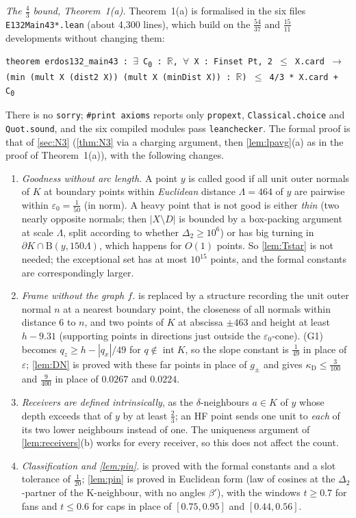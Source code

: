 \documentclass[11pt]{amsart}
\theoremstyle{definition}
\theoremstyle{remark}
\newcommand{\R}{\mathbb{R}}
\newcommand{\Dt}{\Delta_2}
\newcommand{\eps}{\varepsilon}
\newcommand{\Dd}{\mathrm{B}}      %
\begin{document}
\emph{The $\frac43$ bound, Theorem~1\textup{(a)}.} Theorem~1(a) is formalised in the six files \texttt{E132Main43*.lean} (about 4{,}300 lines), which build on the $\frac{54}{37}$ and $\frac{15}{11}$ developments without changing them:
\begin{center}
\texttt{theorem erdos132\_main43 : $\exists$ C\textsubscript{0} : $\R$, $\forall$ X : Finset Pt, 2 $\le$ X.card $\to$ (min (mult X (dist2 X)) (mult X (minDist X)) : $\R$) $\le$ 4/3 * X.card + C\textsubscript{0}}
\end{center}
There is no \texttt{sorry}; \texttt{\#print\allowbreak{} axioms} reports only \texttt{propext}, \texttt{Classical.choice} and \texttt{Quot.sound}, and the six compiled modules pass \texttt{leanchecker}. The formal proof is that of \cref{sec:N3} (\cref{thm:N3} via a charging argument, then \cref{lem:lpavg}(a) as in the proof of Theorem~1(a)), with the following changes.
\begin{enumerate}[leftmargin=2em,label=(\alph*)]
\item \emph{Goodness without arc length.} A point $y$ is called good if all unit outer normals of $K$ at boundary points within \emph{Euclidean} distance $\Lambda=464$ of $y$ are pairwise within $\eps_0=\frac1{50}$ (in norm). A heavy point that is not good is either \emph{thin} (two nearly opposite normals; then $|X\setminus D|$ is bounded by a box-packing argument at scale $\Lambda$, split according to whether $\Dt\ge10^6$) or has big turning in $\partial K\cap\Dd(y,150\Lambda)$, which happens for $O(1)$ points. So \cref{lem:Tstar} is not needed; the exceptional set has at most $10^{15}$ points, and the formal constants are correspondingly larger.
\item \emph{Frame without the graph $f$.}  is replaced by a structure recording the unit outer normal $n$ at a nearest boundary point, the closeness of all normals within distance $6$ to $n$, and two points of $K$ at abscissa $\pm463$ and height at least $h-9.31$ (supporting points in directions just outside the $\eps_0$-cone). (G1) becomes $q_z\ge h-|q_x|/49$ for $q\notin\operatorname{int}K$, so the slope constant is $\frac1{49}$ in place of $\eps$; \cref{lem:DN} is proved with these far points in place of $g_\pm$ and gives $\kappa_{\mathrm D}\le\frac3{100}$ and $\frac9{400}$ in place of $0.0267$ and $0.0224$.
\item \emph{Receivers are defined intrinsically}, as the $\delta$-neighbours $a\in K$ of $y$ whose depth exceeds that of $y$ by at least $\frac23$; an HF point sends one unit to \emph{each} of its two lower neighbours instead of one. The uniqueness argument of \cref{lem:receivers}(b) works for every receiver, so this does not affect the count.
\item \emph{Classification and \cref{lem:pin}.}  is proved with the formal constants and a slot tolerance of $\frac1{20}$; \cref{lem:pin} is proved in Euclidean form (law of cosines at the $\Dt$-partner of the K-neighbour, with no angles $\beta'$), with the windows $t\ge0.7$ for fans and $t\le0.6$ for caps in place of $[0.75,0.95]$ and $[0.44,0.56]$.
\end{enumerate}
\end{document}

